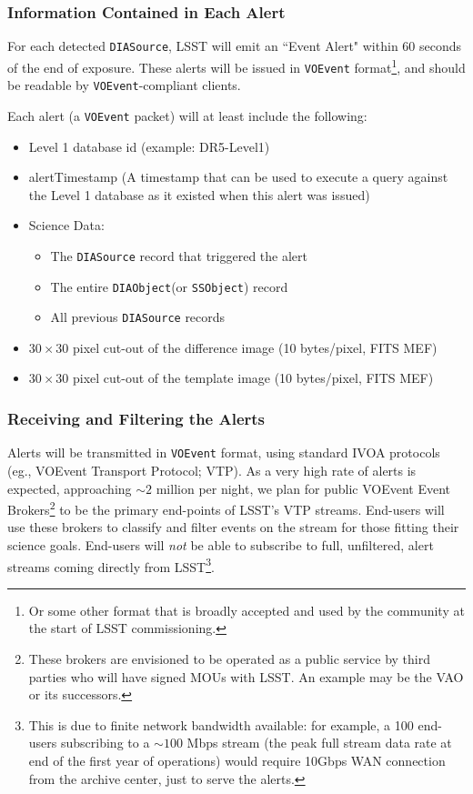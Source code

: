 \documentclass[12pt]{article}
\newcommand{\code}[1]{\texttt{#1}}
\newcommand{\DIASource}{\code{DIASource}\xspace}
\newcommand{\DIAObject}{\code{DIAObject}\xspace}
\newcommand{\DB}{{Level 1 database}\xspace}
\newcommand{\SSObject}{\code{SSObject}\xspace}
\newcommand{\VOEvent}{\code{VOEvent}\xspace}
\begin{document}
\subsubsection{Information Contained in Each Alert}

For each detected \DIASource, LSST will emit an ``Event Alert" within 60 seconds of the end of exposure. These alerts will be issued in \VOEvent format\footnote{Or some other format that is broadly accepted and used by the community at the start of LSST commissioning.}, and should be readable by \VOEvent-compliant clients.

\vspace{1em}
Each alert (a \VOEvent packet) will at least include the following:

\begin{itemize}
\item \DB id (example: DR5-Level1)
\item alertTimestamp (A timestamp that can be used to execute a query against the \DB as it existed when this alert was issued)
\item Science Data:
    \begin{itemize}
    \item The \DIASource record that triggered the alert
    \item The entire \DIAObject (or \SSObject) record
    \item All previous \DIASource records
    \end{itemize}
\item $30\times 30$ pixel cut-out of the difference image (10 bytes/pixel, FITS MEF)
\item $30\times 30$ pixel cut-out of the template image (10 bytes/pixel, FITS MEF)
\end{itemize}

\subsubsection{Receiving and Filtering the Alerts}
\label{sec:eventbrokers}

Alerts will be transmitted in \VOEvent format, using standard IVOA protocols (eg., VOEvent Transport Protocol; VTP). As a very high rate of alerts is expected, approaching $\sim 2$ million per night, we plan for public VOEvent Event Brokers\footnote{These brokers are envisioned to be operated as a public service by third parties who will have signed MOUs with LSST. An example may be the VAO or its successors.} to be the primary end-points of LSST's VTP streams. End-users will use these brokers to classify and filter events on the stream for those fitting their science goals. End-users will {\em not} be able to subscribe to full, unfiltered, alert streams coming directly from LSST\footnote{This is due to finite network bandwidth available: for example, a 100 end-users subscribing to a $\sim 100$ Mbps stream (the peak full stream data rate at end of the first year of operations) would require 10Gbps WAN connection from the archive center, just to serve the alerts.}.
\end{document}
